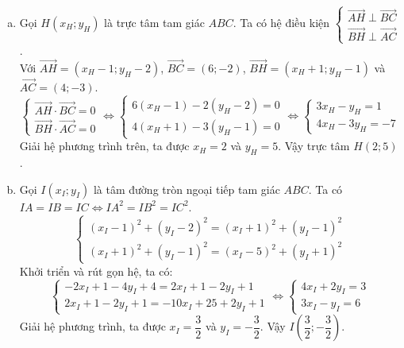\begin{vd}
{\begin{enumerate}[a)]
            \item Gọi $H(x_H; y_H)$ là trực tâm tam giác $ABC$. Ta có hệ điều kiện $\begin{cases} \overrightarrow{AH} \perp \overrightarrow{BC} \\ \overrightarrow{BH} \perp \overrightarrow{AC} \end{cases}$.\\
                  Với $\overrightarrow{AH} = (x_H - 1; y_H - 2)$, $\overrightarrow{BC} = (6; -2)$, $\overrightarrow{BH} = (x_H + 1; y_H - 1)$ và $\overrightarrow{AC} = (4; -3)$.
                  \[ \begin{cases} \overrightarrow{AH} \cdot \overrightarrow{BC} = 0 \\ \overrightarrow{BH} \cdot \overrightarrow{AC} = 0 \end{cases} \Leftrightarrow \begin{cases} 6(x_H - 1) - 2(y_H - 2) = 0 \\ 4(x_H + 1) - 3(y_H - 1) = 0 \end{cases} \Leftrightarrow \begin{cases} 3x_H - y_H = 1 \\ 4x_H - 3y_H = -7 \end{cases} \]
                  Giải hệ phương trình trên, ta được $x_H = 2$ và $y_H = 5$. Vậy trực tâm $H(2; 5)$.

            \item Gọi $I(x_I; y_I)$ là tâm đường tròn ngoại tiếp tam giác $ABC$. Ta có $IA = IB = IC \Leftrightarrow IA^2 = IB^2 = IC^2$.
                  \[ \begin{cases} (x_I - 1)^2 + (y_I - 2)^2 = (x_I + 1)^2 + (y_I - 1)^2 \\ (x_I + 1)^2 + (y_I - 1)^2 = (x_I - 5)^2 + (y_I + 1)^2 \end{cases} \]
                  Khởi triển và rút gọn hệ, ta có:
                  \[ \begin{cases} -2x_I + 1 - 4y_I + 4 = 2x_I + 1 - 2y_I + 1 \\ 2x_I + 1 - 2y_I + 1 = -10x_I + 25 + 2y_I + 1 \end{cases} \Leftrightarrow \begin{cases} 4x_I + 2y_I = 3 \\ 3x_I - y_I = 6 \end{cases} \]
                  Giải hệ phương trình, ta được $x_I = \dfrac{3}{2}$ và $y_I = -\dfrac{3}{2}$. Vậy $I\left(\dfrac{3}{2}; -\dfrac{3}{2}\right)$.


\end{enumerate}}
\end{vd}
